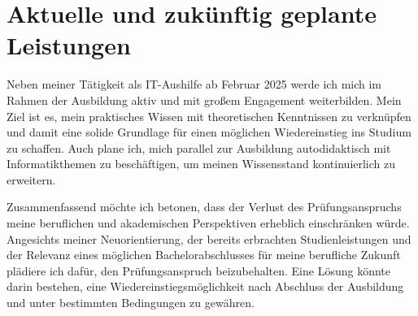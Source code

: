 \documentclass[a4paper,12pt]{article}
\begin{document}
\section*{\normalsize Aktuelle und zukünftig geplante Leistungen}
Neben meiner Tätigkeit als IT-Aushilfe ab Februar 2025 werde ich mich im Rahmen der Ausbildung aktiv und mit großem Engagement weiterbilden.
Mein Ziel ist es, mein praktisches Wissen mit theoretischen Kenntnissen zu verknüpfen und damit eine solide Grundlage für einen möglichen Wiedereinstieg ins Studium zu schaffen.
Auch plane ich, mich parallel zur Ausbildung autodidaktisch mit Informatikthemen zu beschäftigen, um meinen Wissensstand kontinuierlich zu erweitern.

Zusammenfassend möchte ich betonen, dass der Verlust des Prüfungsanspruchs meine beruflichen und akademischen Perspektiven erheblich einschränken würde.
Angesichts meiner Neuorientierung, der bereits erbrachten Studienleistungen und der Relevanz eines möglichen Bachelorabschlusses für meine berufliche Zukunft plädiere ich dafür, den Prüfungsanspruch beizubehalten.
Eine Lösung könnte darin bestehen, eine Wiedereinstiegsmöglichkeit nach Abschluss der Ausbildung und unter bestimmten Bedingungen zu gewähren.
\end{document}
